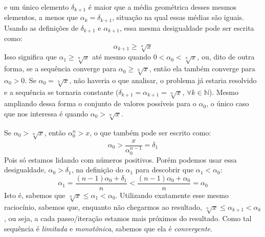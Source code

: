 \documentclass{article}
\begin{document}
e um único elemento $\delta_{k+1}$
é maior que a média geométrica desses mesmos elementos,
a menos que $\alpha_k = \delta_{k+1}$,
situação na qual essas médias são iguais.
Usando as definições de $\delta_{k+1}$ e $\alpha_{k+1}$,
essa mesma desigualdade pode ser escrita como:
\[\alpha_{k+1} \ge \sqrt[n]{x}\]
Isso significa que $\alpha_1 \ge \sqrt[n]{x}$
até mesmo quando $0 < \alpha_0 < \sqrt[n]{x}$,
ou, dito de outra forma,
se a sequência converge para $\alpha_0 \ge \sqrt[n]{x}$,
então ela também converge para $\alpha_0 > 0$.
Se $\alpha_0 = \sqrt[n]{x}$, não haveria o que analisar,
o problema já estaria resolvido
e a sequência se tornaria constante
($\delta_{k+1} = \alpha_{k+1} = \sqrt[n]{x}$,
 $\forall k \in \mathds{N}$).
Mesmo ampliando dessa forma
o conjunto de valores possíveis para o $\alpha_0$,
o único caso que nos interessa é quando $\alpha_0 > \sqrt[n]{x}$.

Se $\alpha_0 > \sqrt[n]{x}$,
então $\alpha_0^n > x$,
o que também pode ser escrito como:
\[\alpha_0 > \dfrac{x}{\alpha_0^{n-1}} = \delta_1\]
Pois só estamos lidando com números positivos.
Porém podemos usar essa desigualdade, $\alpha_0 > \delta_1$,
na definição do $\alpha_1$
para descobrir que $\alpha_1 < \alpha_0$:
\[
  \alpha_1 = \dfrac{(n-1) \alpha_0 + \delta_1}{n}
  < \dfrac{(n-1) \alpha_0 + \alpha_0}{n} = \alpha_0
\]
Isto é, sabemos que $\sqrt[n]{x} \le \alpha_1 < \alpha_0$.
Utilizando exatamente esse mesmo raciocínio,
sabemos que, enquanto não chegarmos ao resultado,
$\sqrt[n]{x} \le \alpha_{k+1} < \alpha_k$,
ou seja, a cada passo/iteração estamos mais próximos do resultado.
Como tal sequência é \emph{limitada} e \emph{monotônica},
sabemos que ela é \emph{convergente}.
\end{document}
